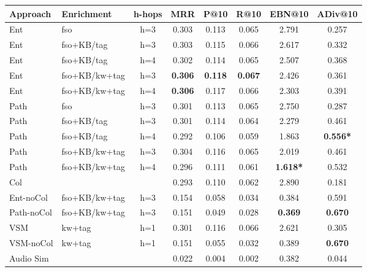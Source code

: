 \begin{table}
\scriptsize
	\label{tbl:graph-rec:Res1}
\begin{tabular}{l l c c c c c c }
		\toprule
		\textbf{Approach} & \textbf{Enrichment} & \textbf{h-hops} & \textbf{MRR} &  \textbf{P@10} & \textbf{R@10} & \textbf{EBN@10}  & \textbf{ADiv@10}\\
		\midrule
		Ent & fso & h=3 & 0.303 & 0.113  &  0.065 & 2.791	& 0.257   \\
		Ent & fso+KB/tag & h=3 & 0.303 & 0.115  &  0.066  & 2.617 &	0.332  \\
		Ent & fso+KB/tag & h=4 & 0.302 & 0.114  & 0.065  & 2.507 & 0.368  \\
		Ent & fso+KB/kw+tag & h=3 & \textbf{0.306 }& \textbf{0.118}  &  \textbf{0.067}  & 2.426 &	0.361  \\
		Ent & fso+KB/kw+tag & h=4 & \textbf{0.306}  & 0.117 & 0.066  &2.303  & 0.391   \\ 
		Path & fso & h=3 &  0.301 &  0.113  &  0.065   & 2.750 & 0.287   \\
		Path & fso+KB/tag & h=3 & 0.301 &  0.114 &  0.064 & 2.279 	& 0.461   \\
		Path & fso+KB/tag & h=4 &   0.292 & 0.106 & 0.059   & 1.863 & \textbf{0.556*}   \\
		Path & fso+KB/kw+tag & h=3 &  0.304 & 0.116 &  0.065    & 2.019 &	0.461     \\
		Path & fso+KB/kw+tag & h=4 & 0.296 & 0.111 &	0.061      & \textbf{1.618*}	& 0.532   \\
		\midrule
		Col & & & 0.293 & 0.110 & 0.062 &	2.890 &	0.181 \\	
		Ent-noCol & fso+KB/kw+tag & h=3 & 0.154   & 0.058	 &0.034	  & 0.384	& 0.591   \\		
		Path-noCol & fso+KB/kw+tag & h=3 & 0.151 & 0.049 & 0.028  & \textbf{0.369} & \textbf{0.670}   \\			
		VSM & kw+tag & h=1 & 0.301 &   0.116 &  0.066  & 2.621 &	0.305 \\
		VSM-noCol & kw+tag & h=1 & 0.151  & 0.055 	 & 0.032	& 0.389 & \textbf{0.670} \\
		Audio Sim & & & 0.022 & 0.004 & 0.002 &	0.382	&	0.044 \\
		\bottomrule
	\end{tabular}
	

\end{table}
